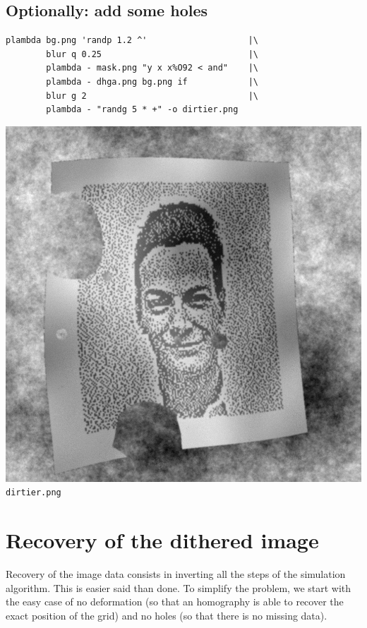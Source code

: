 \subsection{Optionally: add some holes}
\begin{verbatim}
plambda bg.png 'randp 1.2 ^'                    |\
        blur q 0.25                             |\
        plambda - mask.png "y x x%O92 < and"    |\
        plambda - dhga.png bg.png if            |\
        blur g 2                                |\
        plambda - "randg 5 * +" -o dirtier.png
\end{verbatim}
\includegraphics{dirtier.png}\verb+dirtier.png+

\section{Recovery of the dithered image}

Recovery of the image data consists in inverting all the steps of the
simulation algorithm.  This is easier said than done.  To simplify the
problem, we start with the easy case of no deformation (so that an homography
is able to recover the exact position of the grid) and no holes (so that
there is no missing data).

